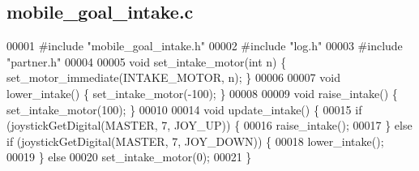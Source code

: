\subsection{mobile\+\_\+goal\+\_\+intake.\+c}
\label{mobile__goal__intake_8c_source}

\begin{DoxyCode}
00001 \textcolor{preprocessor}{#include "mobile_goal_intake.h"}
00002 \textcolor{preprocessor}{#include "log.h"}
00003 \textcolor{preprocessor}{#include "partner.h"}
00004 
00005 \textcolor{keywordtype}{void} set_intake_motor(\textcolor{keywordtype}{int} n) \{ set_motor_immediate(INTAKE_MOTOR, n); \}
00006 
00007 \textcolor{keywordtype}{void} lower_intake() \{ set_intake_motor(-100); \}
00008 
00009 \textcolor{keywordtype}{void} raise_intake() \{ set_intake_motor(100); \}
00010 
00014 \textcolor{keywordtype}{void} update_intake() \{
00015   \textcolor{keywordflow}{if} (joystickGetDigital(MASTER, 7, JOY\_UP)) \{
00016     raise_intake();
00017   \} \textcolor{keywordflow}{else} \textcolor{keywordflow}{if} (joystickGetDigital(MASTER, 7, JOY\_DOWN)) \{
00018     lower_intake();
00019   \} \textcolor{keywordflow}{else}
00020     set_intake_motor(0);
00021 \}
\end{DoxyCode}
